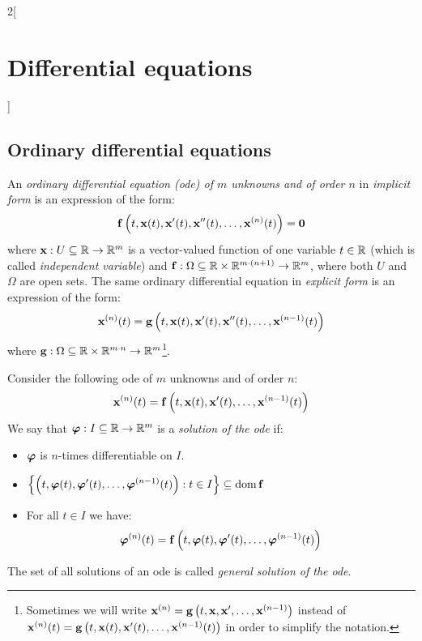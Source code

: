 \documentclass[../../../main.tex]{subfiles}
\begin{document}
\begin{multicols}{2}[\section{Differential equations}]
    \subsection{Ordinary differential equations}
    \begin{definition}
        An \textit{ordinary differential equation (ode) of $m$ unknowns and of order $n$} in \textit{implicit form} is an expression of the form: $$\boldsymbol{\mathrm{f}}\left(t,\boldsymbol{\mathrm{x}}(t),\boldsymbol{\mathrm{x}}'(t),\boldsymbol{\mathrm{x}}''(t),\ldots,\boldsymbol{\mathrm{x}}^{(n)}(t)\right)=\boldsymbol{\mathrm{0}}$$
        where $\boldsymbol{\mathrm{x}}:U\subseteq\mathbb{R}\rightarrow\mathbb{R}^m$ is a vector-valued function of one variable $t\in\mathbb{R}$ (which is called \textit{independent variable}) and $\boldsymbol{\mathrm{f}}:\Omega\subseteq\mathbb{R}\times\mathbb{R}^{m\cdot(n+1)}\rightarrow\mathbb{R}^m$, where both $U$ and $\Omega$ are open sets. The same ordinary differential equation in \textit{explicit form} is an expression of the form: $$\boldsymbol{\mathrm{x}}^{(n)}(t)=\boldsymbol{\mathrm{g}}\left(t,\boldsymbol{\mathrm{x}}(t),\boldsymbol{\mathrm{x}}'(t),\boldsymbol{\mathrm{x}}''(t),\ldots,\boldsymbol{\mathrm{x}}^{(n-1)}(t)\right)$$
        where $\boldsymbol{\mathrm{g}}:\Omega\subseteq\mathbb{R}\times\mathbb{R}^{m\cdot n}\rightarrow\mathbb{R}^m$\footnote{Sometimes we will write $\boldsymbol{\mathrm{x}}^{(n)}=\boldsymbol{\mathrm{g}}\left(t,\boldsymbol{\mathrm{x}},\boldsymbol{\mathrm{x}}',\ldots,\boldsymbol{\mathrm{x}}^{(n-1)}\right)$ instead of $\boldsymbol{\mathrm{x}}^{(n)}(t)=\boldsymbol{\mathrm{g}}\left(t,\boldsymbol{\mathrm{x}}(t),\boldsymbol{\mathrm{x}}'(t),\ldots,\boldsymbol{\mathrm{x}}^{(n-1)}(t)\right)$ in order to simplify the notation.}.
    \end{definition}
    \begin{definition}
        Consider the following ode of $m$ unknowns and of order $n$:
        \begin{equation}\label{DE_ode1}
            \boldsymbol{\mathrm{x}}^{(n)}(t)=\boldsymbol{\mathrm{f}}\left(t,\boldsymbol{\mathrm{x}}(t),\boldsymbol{\mathrm{x}}'(t),\ldots,\boldsymbol{\mathrm{x}}^{(n-1)}(t)\right)
        \end{equation}
        We say that $\boldsymbol{\mathrm{\varphi}}:I\subseteq\mathbb{R}\rightarrow\mathbb{R}^m$ is a \textit{solution of the ode} if:
        \begin{itemize}
            \item $\boldsymbol{\mathrm{\varphi}}$ is $n$-times differentiable on $I$.
            \item $\displaystyle\left\{\left(t,\boldsymbol{\mathrm{\varphi}}(t),\boldsymbol{\mathrm{\varphi}}'(t),\ldots,\boldsymbol{\mathrm{\varphi}}^{(n-1)}(t)\right):t\in I\right\}\subseteq\operatorname{dom} \boldsymbol{\mathrm{f}}$
            \item For all $t\in I$ we have:
                  $$\boldsymbol{\mathrm{\varphi}}^{(n)}(t)=\boldsymbol{\mathrm{f}}\left(t,\boldsymbol{\mathrm{\varphi}}(t),\boldsymbol{\mathrm{\varphi}}'(t),\ldots,\boldsymbol{\mathrm{\varphi}}^{(n-1)}(t)\right)$$
        \end{itemize}
        The set of all solutions of an ode is called \textit{general solution of the ode}.
    \end{definition}

\end{multicols}
\end{document}
